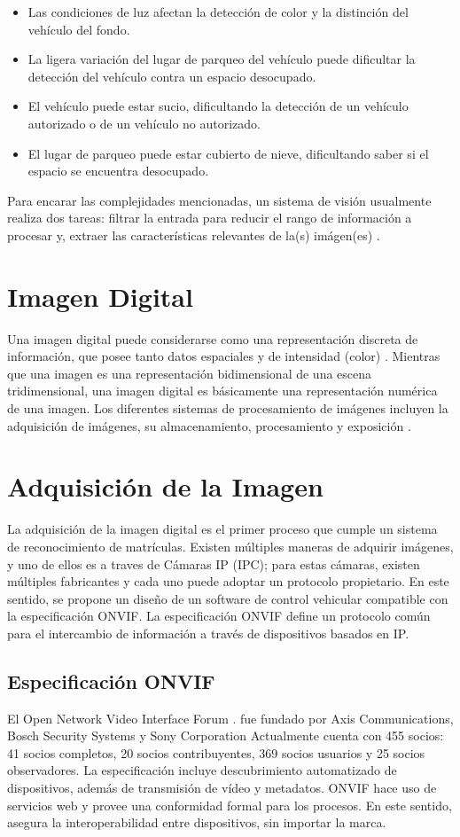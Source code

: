 \begin{itemize}
    \item Las condiciones de luz afectan la detección de color y la distinción del vehículo del fondo.
    \item La ligera variación del lugar de parqueo del vehículo puede dificultar la detección del vehículo contra un espacio desocupado. 
    \item El vehículo puede estar sucio, dificultando la detección de un vehículo autorizado o de un vehículo no autorizado. 
    \item El lugar de parqueo puede estar cubierto de nieve, dificultando saber si el espacio se encuentra desocupado.
\end{itemize}
Para encarar las complejidades mencionadas, un sistema de visión usualmente realiza dos tareas: filtrar la entrada para reducir el rango de información a procesar y, extraer las características relevantes de la(s) imágen(es) \parencite{Demaagd2012-qb}.

\section{Imagen Digital}
Una imagen digital puede considerarse como una representación discreta de información, que posee tanto datos espaciales y de intensidad (color) \parencite{Solomon2011-xz}.
Mientras que una imagen es una representación bidimensional de una escena tridimensional, una imagen digital es básicamente una representación numérica de una imagen. Los diferentes sistemas de procesamiento de imágenes incluyen la adquisición de imágenes, su almacenamiento, procesamiento y exposición \parencite{Jayaraman2011-jb}.
\section{Adquisición de la Imagen}
La adquisición de la imagen digital es el primer proceso que cumple un sistema de reconocimiento de matrículas. Existen múltiples maneras de adquirir imágenes, y uno de ellos es a traves de Cámaras IP (IPC); para estas cámaras, existen múltiples fabricantes y cada uno puede adoptar un protocolo propietario. En este sentido, se propone un diseño de un software de control vehicular compatible con la especificación ONVIF. La especificación ONVIF define un protocolo común para el intercambio de información a través de dispositivos basados en IP. 

\subsection{Especificación ONVIF}
El Open Network Video Interface Forum \parencite{Onvif2016-bt}. fue fundado por Axis Communications, Bosch Security Systems y Sony Corporation Actualmente cuenta con 455 socios: 41 socios completos, 20 socios contribuyentes, 369 socios usuarios y 25 socios observadores. La especificación incluye descubrimiento automatizado de  dispositivos,  además de  transmisión de vídeo y metadatos. ONVIF hace uso de servicios web y provee una conformidad formal para los procesos. En este sentido, asegura la interoperabilidad entre dispositivos, sin importar la marca. 


